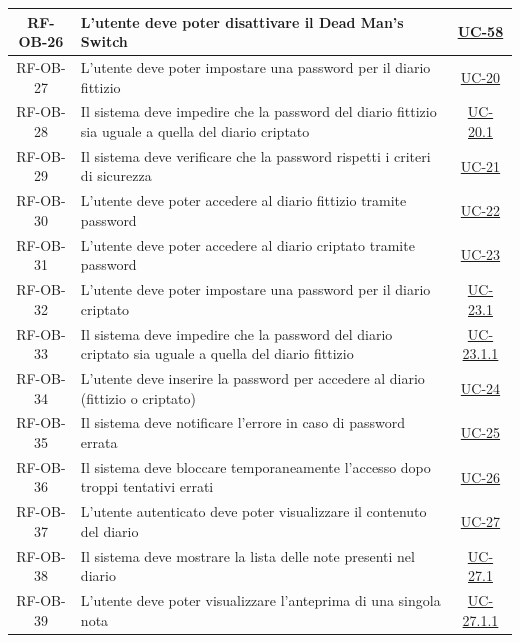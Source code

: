 \documentclass[a4paper,12pt]{article}
\begin{document}
\begin{center}
\begin{longtable}{|c|p{9cm}|c|}
\hline
\rowcolor{gray!20}
RF-OB-26 & L'utente deve poter disattivare il Dead Man's Switch & \hyperref[sec:UC-58]{UC-58} \\
\hline
\rowcolor{white}
RF-OB-27 & L'utente deve poter impostare una password per il diario fittizio & \hyperref[subsec:UC-20]{UC-20} \\
\hline
\rowcolor{gray!20}
RF-OB-28 & Il sistema deve impedire che la password del diario fittizio sia uguale a quella del diario criptato & \hyperref[subsec:UC-20.1]{UC-20.1} \\
\hline
\rowcolor{white}
RF-OB-29 & Il sistema deve verificare che la password rispetti i criteri di sicurezza & \hyperref[subsec:UC-21]{UC-21} \\
\hline
\rowcolor{gray!20}
RF-OB-30 & L'utente deve poter accedere al diario fittizio tramite password & \hyperref[subsec:UC-22]{UC-22} \\
\hline
\rowcolor{white}
RF-OB-31 & L'utente deve poter accedere al diario criptato tramite password & \hyperref[subsec:UC-23]{UC-23} \\
\hline
\rowcolor{gray!20}
RF-OB-32 & L'utente deve poter impostare una password per il diario criptato & \hyperref[subsec:UC-23.1]{UC-23.1} \\
\hline
\rowcolor{white}
RF-OB-33 & Il sistema deve impedire che la password del diario criptato sia uguale a quella del diario fittizio & \hyperref[subsec:UC-23.1.1]{UC-23.1.1} \\
\hline
\rowcolor{gray!20}
RF-OB-34 & L'utente deve inserire la password per accedere al diario (fittizio o criptato) & \hyperref[subsec:UC-24]{UC-24} \\
\hline
\rowcolor{white}
RF-OB-35 & Il sistema deve notificare l'errore in caso di password errata & \hyperref[subsec:UC-25]{UC-25} \\
\hline
\rowcolor{gray!20}
RF-OB-36 & Il sistema deve bloccare temporaneamente l'accesso dopo troppi tentativi errati & \hyperref[subsec:UC-26]{UC-26} \\
\hline
\rowcolor{white}
RF-OB-37 & L'utente autenticato deve poter visualizzare il contenuto del diario & \hyperref[subsec:UC-27]{UC-27} \\
\hline
\rowcolor{gray!20}
RF-OB-38 & Il sistema deve mostrare la lista delle note presenti nel diario & \hyperref[subsec:UC-27.1]{UC-27.1} \\
\hline
\rowcolor{white}
RF-OB-39 & L'utente deve poter visualizzare l'anteprima di una singola nota & \hyperref[subsec:UC-27.1.1]{UC-27.1.1} \\

\end{longtable}
\end{center}
\end{document}
